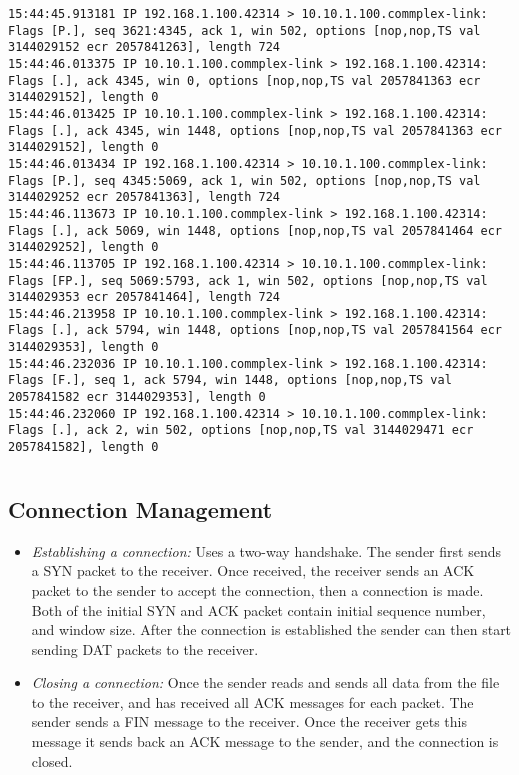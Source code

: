 \documentclass{article}
\begin{document}
{\begin{lstlisting}
15:44:45.913181 IP 192.168.1.100.42314 > 10.10.1.100.commplex-link: Flags [P.], seq 3621:4345, ack 1, win 502, options [nop,nop,TS val 3144029152 ecr 2057841263], length 724
15:44:46.013375 IP 10.10.1.100.commplex-link > 192.168.1.100.42314: Flags [.], ack 4345, win 0, options [nop,nop,TS val 2057841363 ecr 3144029152], length 0
15:44:46.013425 IP 10.10.1.100.commplex-link > 192.168.1.100.42314: Flags [.], ack 4345, win 1448, options [nop,nop,TS val 2057841363 ecr 3144029152], length 0
15:44:46.013434 IP 192.168.1.100.42314 > 10.10.1.100.commplex-link: Flags [P.], seq 4345:5069, ack 1, win 502, options [nop,nop,TS val 3144029252 ecr 2057841363], length 724
15:44:46.113673 IP 10.10.1.100.commplex-link > 192.168.1.100.42314: Flags [.], ack 5069, win 1448, options [nop,nop,TS val 2057841464 ecr 3144029252], length 0
15:44:46.113705 IP 192.168.1.100.42314 > 10.10.1.100.commplex-link: Flags [FP.], seq 5069:5793, ack 1, win 502, options [nop,nop,TS val 3144029353 ecr 2057841464], length 724
15:44:46.213958 IP 10.10.1.100.commplex-link > 192.168.1.100.42314: Flags [.], ack 5794, win 1448, options [nop,nop,TS val 2057841564 ecr 3144029353], length 0
15:44:46.232036 IP 10.10.1.100.commplex-link > 192.168.1.100.42314: Flags [F.], seq 1, ack 5794, win 1448, options [nop,nop,TS val 2057841582 ecr 3144029353], length 0
15:44:46.232060 IP 192.168.1.100.42314 > 10.10.1.100.commplex-link: Flags [.], ack 2, win 502, options [nop,nop,TS val 3144029471 ecr 2057841582], length 0
\end{lstlisting}
}

\newpage
\section{}
\subsection{Connection Management}
\begin{itemize}
    \item
        \textit{Establishing a connection:} Uses a two-way handshake.
        The sender first sends a SYN packet to the receiver. Once received, the receiver sends 
        an ACK packet to the sender to accept the connection, then a connection is made. Both of the 
        initial SYN and ACK packet contain initial sequence number, and window size.
        After the connection is established the sender can then start sending DAT packets to the receiver.
    \item 
        \textit{Closing a connection:}
        Once the sender reads and sends all data from the file to the receiver, and has received all
        ACK messages for each packet. The sender sends a FIN message to the receiver. Once the 
        receiver gets this message it sends back an ACK message to the sender, and the connection is closed.
\end{itemize}
\end{document}
